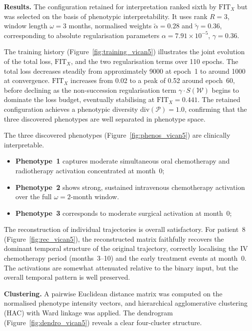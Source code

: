 \documentclass[pdflatex,sn-mathphys-num,referee,lineno]{sn-jnl}
\begin{document}
\textbf{Results.}
The configuration retained for interpretation ranked sixth by $\text{FIT}_X$ but was selected on the basis of phenotypic interpretability.
It uses rank $R = 3$, window length $\omega = 3$ months, normalised weights $\tilde{\alpha} = 0.28$ and $\tilde{\gamma} = 0.36$, corresponding to absolute regularisation parameters $\alpha = 7.91 \times 10^{-5}$, $\gamma = 0.36$.

The training history (Figure~\ref{fig:training_vican5}) illustrates the joint evolution of the total loss, $\text{FIT}_X$, and the two regularisation terms over 110 epochs.
The total loss decreases steadily from approximately 9000 at epoch~1 to around 1000 at convergence.
$\text{FIT}_X$ increases from 0.02 to a peak of 0.52 around epoch~60, before declining as the non-succession regularisation term $\gamma \cdot S(\mathcal{W})$ begins to dominate the loss budget, eventually stabilising at $\text{FIT}_X = 0.441$.
The retained configuration achieves a phenotypic diversity $\text{div}(\mathcal{P}) = 1.0$, confirming that the three discovered phenotypes are well separated in phenotype space.

The three discovered phenotypes (Figure~\ref{fig:phenos_vican5}) are clinically interpretable.
\begin{itemize}
  \item \textbf{Phenotype~1} captures moderate simultaneous oral chemotherapy and radiotherapy activation concentrated at month~0; 
  \item \textbf{Phenotype~2} shows strong, sustained intravenous chemotherapy activation over the full $\omega = 2$-month window.
  \item \textbf{Phenotype~3} corresponds to moderate surgical activation at month~0; 
\end{itemize}

The reconstruction of individual trajectories is overall satisfactory. 
For patient~8 (Figure~\ref{fig:rec_vican5}), the reconstructed matrix faithfully recovers the dominant temporal structure of the original trajectory, correctly localising the IV chemotherapy period (months~3--10) and the early treatment events at month~0. 
The activations are somewhat attenuated relative to the binary input, but the overall temporal pattern is well preserved.

\textbf{Clustering.}
A pairwise Euclidean distance matrix was computed on the normalised phenotype intensity vectors, and hierarchical agglomerative clustering (HAC) with Ward linkage was applied.
The dendrogram (Figure~\ref{fig:dendro_vican5}) reveals a clear four-cluster structure.
\end{document}
